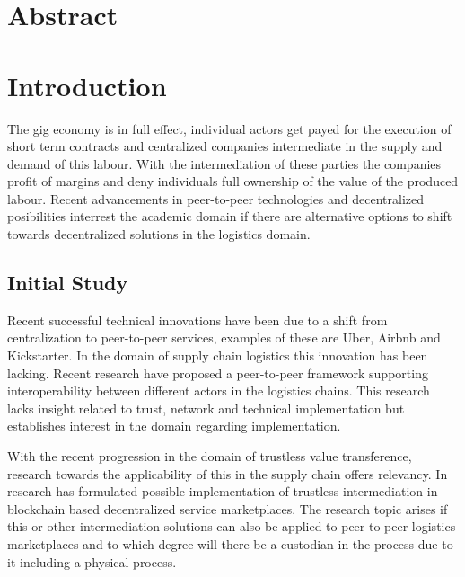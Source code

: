 \documentclass[Nomencl]{DylanMaster}
\begin{document}
\mytitlepage
\tableofcontents
\newpage

\section{Abstract}

\section{Introduction}

The gig economy is in full effect, individual actors get payed for the execution of short term contracts and centralized companies intermediate in the supply and demand of this labour. With the intermediation of these parties the companies profit of margins and deny individuals full ownership of the value of the produced labour. Recent advancements in peer-to-peer technologies and decentralized posibilities interrest the academic domain if there are alternative options to shift towards decentralized solutions in the logistics domain\cite{research_demand}\cite{research_demand}\cite{research_demand}.\par

\subsection{Initial Study}

Recent successful technical innovations have been due to a shift from centralization to peer-to-peer services, examples of these are Uber, Airbnb and Kickstarter. In the domain of supply chain logistics this innovation has been lacking. Recent research \cite{peer-to-peerDecentralizedLogistics} have proposed a peer-to-peer framework supporting interoperability between different actors in the logistics chains. This research lacks insight related to trust, network and technical implementation but establishes interest in the domain regarding implementation. \par
With the recent progression in the domain of trustless value transference, research towards the applicability of this in the supply chain offers relevancy. In \cite{trustlessIntermediationInBCServiceMarket} research has formulated possible implementation of trustless intermediation in blockchain based decentralized service marketplaces. The research topic arises if this or other intermediation solutions can also be applied to peer-to-peer logistics marketplaces and to which degree will there be a custodian in the process due to it including a physical process.
\end{document}
